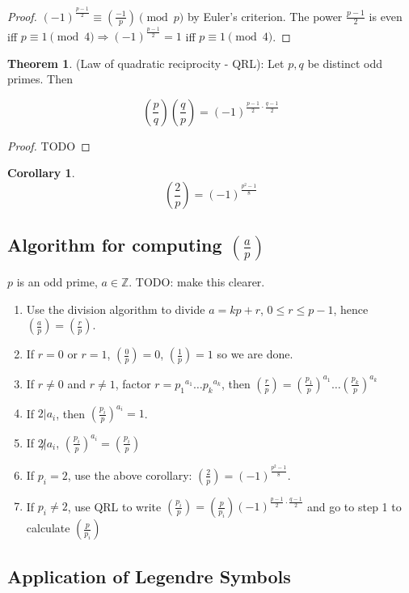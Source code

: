 \documentclass[12pt,a4paper]{article}
\theoremstyle{definition}
\newtheorem{theorem}[definition]{Theorem}
\newtheorem{corollary}[definition]{Corollary}
\begin{document}
\begin{proof}
	$(-1)^{\frac{p - 1}{2}} \equiv (\frac{-1}{p}) \pmod{p}$ by Euler's criterion.
	The power $\frac{p - 1}{2}$ is even iff $p \equiv 1 \pmod{4} \Rightarrow (-1)^{\frac{p - 1}{2}} = 1$ iff $p \equiv 1 \pmod{4}$.
\end{proof}

\begin{theorem}
	(Law of quadratic reciprocity - QRL): Let $p, q$ be distinct odd primes. Then
	
	\[(\frac{p}{q}) (\frac{q}{p}) = (-1)^{\frac{p - 1}{2} \cdot \frac{q - 1}{2}}\]
\end{theorem}

\begin{proof}
	TODO
\end{proof}

\begin{corollary}
	\[(\frac{2}{p}) = (-1)^{\frac{p^2 - 1}{8}}\]
\end{corollary}

\subsection{Algorithm for computing $(\frac{a}{p})$}

$p$ is an odd prime, $a \in \mathbb{Z}$. TODO: make this clearer.

\begin{enumerate}
	\item Use the division algorithm to divide $a = kp + r$, $0 \le r \le p - 1$, hence $(\frac{a}{p}) = (\frac{r}{p})$.
	\item If $r = 0$ or $r = 1$, $(\frac{0}{p}) = 0$, $(\frac{1}{p}) = 1$ so we are done.
	\item If $r \ne 0$ and $r \ne 1$, factor $r = {p_1}^{a_1} \dots {p_k}^{a_k}$, then $(\frac{r}{p}) = (\frac{p_1}{p})^{a_1} \dots (\frac{p_k}{p})^{a_k}$
	\item If $2 | a_i$, then $(\frac{p_i}{p})^{a_i} = 1$.
	\item If $2 \not | a_i$, $(\frac{p_i}{p})^{a_i} = (\frac{p_i}{p})$
	\item If $p_i = 2$, use the above corollary: $(\frac{2}{p}) = (-1)^{\frac{p^2 - 1}{8}}$.
	\item If $p_i \ne 2$, use QRL to write $(\frac{p_i}{p}) = (\frac{p}{p_i}) (-1)^{\frac{p - 1}{2} \cdot \frac{q - 1}{2}}$ and go to step 1 to calculate $(\frac{p}{p_i})$
\end{enumerate}

\subsection{Application of Legendre Symbols}
\end{document}
